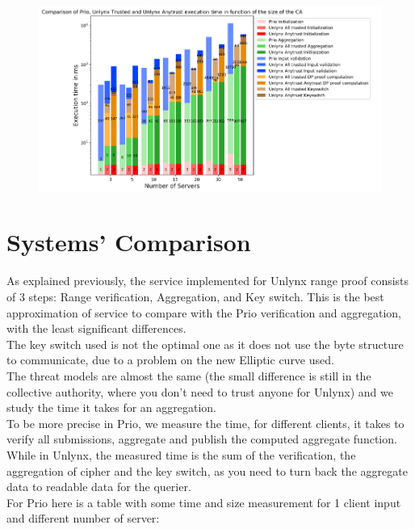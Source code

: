 \documentclass{article}
\begin{document}
\begin{figure}[H]
\centering
\includegraphics[scale=0.7]{img/ComparisonServer.png}
\end{figure}
\section{Systems' Comparison}
As explained previously, the service implemented for Unlynx range proof consists of 3 steps: Range verification, Aggregation, and Key switch. This is the best approximation of service to compare with the Prio verification and aggregation, with the least significant differences.\\
The key switch used is not the optimal one as it does not use the byte structure to communicate, due to a problem on the new Elliptic curve used.\\

The threat models are almost the same (the small difference is still in the collective authority, where you don't need to trust anyone for Unlynx) and we study the time it takes for an aggregation.\\
To be more precise in Prio, we measure the time, for different clients, it takes to verify all submissions, aggregate and publish the computed aggregate function.
While in Unlynx, the measured time is the sum of the verification, the aggregation of cipher and the key switch, as you need to turn back the aggregate data to readable data for the querier.\\

For Prio here is a table with some time and size measurement for 1 client input and different number of server:\\
\end{document}
